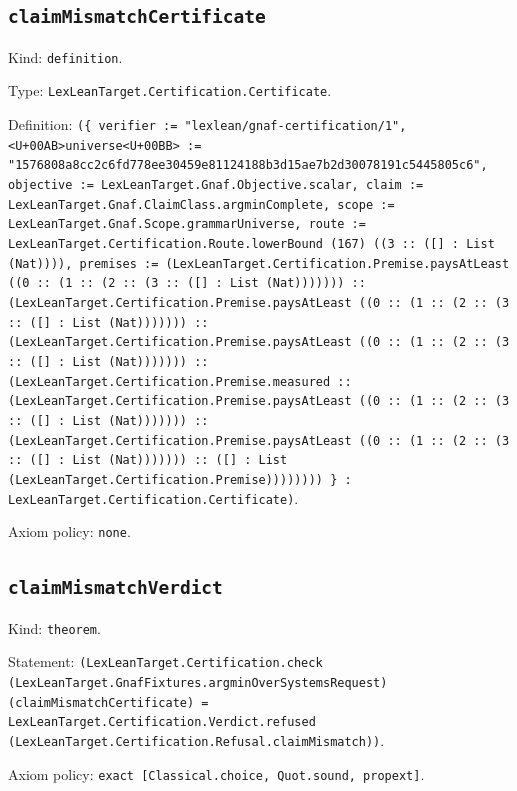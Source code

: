 \documentclass[11pt]{article}
\begin{document}
\subsection*{\texttt{claimMismatchCertificate}}
\noindent Kind: \texttt{definition}.\par
\noindent Type: \texttt{LexLeanTarget.Certification.Certificate}.\par
\noindent Definition: \texttt{(\{ verifier := "lexlean/gnaf-certification/1", <U+00AB>universe<U+00BB> := "1576808a8cc2c6fd778ee30459e81124188b3d15ae7b2d30078191c5445805c6", objective := LexLeanTarget.Gnaf.Objective.scalar, claim := LexLeanTarget.Gnaf.ClaimClass.argminComplete, scope := LexLeanTarget.Gnaf.Scope.grammarUniverse, route := LexLeanTarget.Certification.Route.lowerBound (167) ((3 :: ([] : List (Nat)))), premises := (LexLeanTarget.Certification.Premise.paysAtLeast ((0 :: (1 :: (2 :: (3 :: ([] : List (Nat))))))) :: (LexLeanTarget.Certification.Premise.paysAtLeast ((0 :: (1 :: (2 :: (3 :: ([] : List (Nat))))))) :: (LexLeanTarget.Certification.Premise.paysAtLeast ((0 :: (1 :: (2 :: (3 :: ([] : List (Nat))))))) :: (LexLeanTarget.Certification.Premise.measured :: (LexLeanTarget.Certification.Premise.paysAtLeast ((0 :: (1 :: (2 :: (3 :: ([] : List (Nat))))))) :: (LexLeanTarget.Certification.Premise.paysAtLeast ((0 :: (1 :: (2 :: (3 :: ([] : List (Nat))))))) :: ([] : List (LexLeanTarget.Certification.Premise)))))))) \} : LexLeanTarget.Certification.Certificate)}.\par
\noindent Axiom policy: \texttt{none}.\par
\subsection*{\texttt{claimMismatchVerdict}}
\noindent Kind: \texttt{theorem}.\par
\noindent Statement: \texttt{(LexLeanTarget.Certification.check (LexLeanTarget.GnafFixtures.argminOverSystemsRequest) (claimMismatchCertificate) = LexLeanTarget.Certification.Verdict.refused (LexLeanTarget.Certification.Refusal.claimMismatch))}.\par
\noindent Axiom policy: \texttt{exact [Classical.choice, Quot.sound, propext]}.\par
\end{document}
